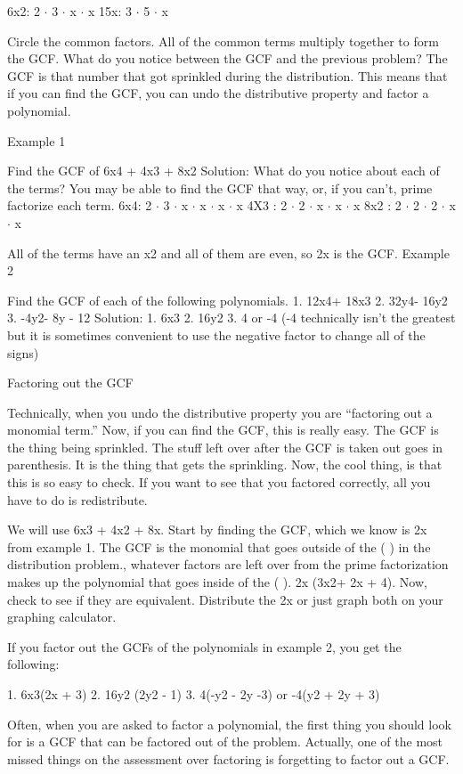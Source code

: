  6x2: 2 $\cdot$ 3 $\cdot$ x $\cdot$ x 
15x: 3 $\cdot$ 5 $\cdot$ x 

Circle the common factors. All of the common terms multiply together to form the GCF. What do you notice between the GCF and the previous problem? The GCF is that number that got sprinkled during the distribution. This means that if you can find the GCF, you can undo the distributive property and factor a polynomial.

Example 1

Find the GCF of 6x4 + 4x3 + 8x2 
Solution:
What do you notice about each of the terms? You may be able to find the GCF that way, or, if you can't, prime factorize each term.
6x4: 2 $\cdot$ 3 $\cdot$ x $\cdot$ x $\cdot$ x $\cdot$ x 
4X3 : 2 $\cdot$ 2 $\cdot$ x $\cdot$ x $\cdot$ x 
8x2 : 2 $\cdot$ 2 $\cdot$ 2 $\cdot$ x $\cdot$ x 

All of the terms have an x2 and all of them are even, so 2x is the GCF.
Example 2

Find the GCF of each of the following polynomials. 
1. 12x4+ 18x3
2. 32y4- 16y2
3. -4y2- 8y - 12
Solution:
1. 6x3 
2. 16y2 
3. 4 or -4 (-4 technically isn't the greatest but it is sometimes convenient to use the negative factor to change all of the signs)

Factoring out the GCF

Technically, when you undo the distributive property you are ``factoring out a monomial term.'' Now, if you can find the GCF, this is really easy. The GCF is the thing being sprinkled. The stuff left over after the GCF is taken out goes in parenthesis. It is the thing that gets the sprinkling. Now, the cool thing, is that this is so easy to check. If you want to see that you factored correctly, all you have to do is redistribute.

We will use 6x3 + 4x2 + 8x. Start by finding the GCF, which we know is 2x from example 1. The GCF is the monomial that goes outside of the ( ) in the distribution problem., whatever factors are left over from the prime factorization makes up the polynomial that goes inside of the ( ). 2x (3x2+ 2x + 4). Now, check to see if they are equivalent. Distribute the 2x or just graph both on your graphing calculator. 

If you factor out the GCFs of the polynomials in example 2, you get the following:

1. 6x3(2x + 3)
2. 16y2 (2y2 - 1)
3. 4(-y2 - 2y -3) or -4(y2 + 2y + 3)

Often, when you are asked to factor a polynomial, the first thing you should look for is a GCF that can be factored out of the problem. Actually, one of the most missed things on the assessment over factoring is forgetting to factor out a GCF. 

